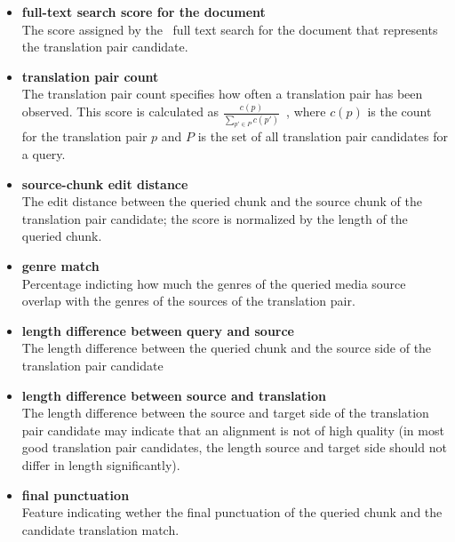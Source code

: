 \begin{itemize}
	
	\item \textbf{full-text search score for the document}\\
	The score assigned by the \postgres~full text search for the document that represents the translation pair candidate.
    
	\item \textbf{translation pair count}\\%
	The translation pair count specifies how often a translation pair has been observed. This score is calculated as $\frac{c(p)}{ \sum_{p' \in P}{c(p')}  } $\ , where $c(p)$ is the count for the translation pair $p$ and $P$ is the set of all translation pair candidates for a query.
	
	\item \textbf{source-chunk edit distance}\\
	The edit distance between the queried chunk and the source chunk of the translation pair candidate; the score is normalized by the length of the queried chunk.
	
	\item \textbf{genre match}\\
	Percentage indicting how much the genres of the queried media source overlap with the genres of the sources of the translation pair.

	\item \textbf{length difference between query and source}\\
	The length difference between the queried chunk and the source side of the translation pair candidate 


	\item \textbf{length difference between source and translation}\\
	The length difference between the source and target side of the translation pair candidate may indicate that an alignment is not of high quality (in most good translation pair candidates,  the length source and target side should not differ in length significantly).
	
	\item \textbf{final punctuation}\\
	Feature indicating wether the final punctuation of the queried chunk and the candidate translation match.

\end{itemize}



